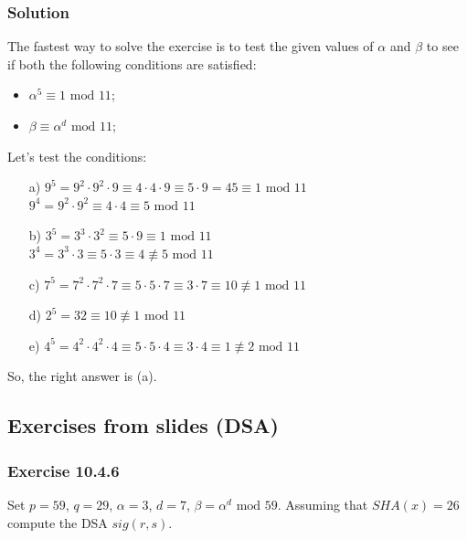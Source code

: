\documentclass[11pt, a4paper]{article}
\newcommand{\mymod}{
    \text{ mod }
}
\begin{document}
\subsubsection*{Solution}
The fastest way to solve the exercise is to test the given values of $\alpha$ and $\beta$ to see if both the following conditions are satisfied:
\begin{itemize}
    \item $\alpha^5\equiv1\mymod11$;
    \item $\beta\equiv\alpha^d\mymod11$;
\end{itemize}
Let's test the conditions:
\begin{itemize}
    \item[a)] $9^5=9^2\cdot9^2\cdot9\equiv4\cdot4\cdot9\equiv5\cdot9=45\equiv1\mymod11$ \textcolor{Green}{\checkmark}\\
    $9^4=9^2\cdot9^2\equiv4\cdot4\equiv5\mymod11$ \textcolor{Green}{\checkmark}
    \item[b)] $3^5=3^3\cdot3^2\equiv5\cdot9\equiv1\mymod11$ \checkmark\\
    $3^4=3^3\cdot3\equiv5\cdot3\equiv4\not\equiv5\mymod11$
    \item[c)] $7^5=7^2\cdot7^2\cdot7\equiv5\cdot5\cdot7\equiv3\cdot7\equiv10\not\equiv1\mymod11$
    \item[d)] $2^5=32\equiv10\not\equiv1\mymod11$
    \item[e)] $4^5=4^2\cdot4^2\cdot4\equiv5\cdot5\cdot4\equiv3\cdot4\equiv1\not\equiv2\mymod11$
\end{itemize}
So, the right answer is (a).

\newpage
\subsection{Exercises from slides (DSA)}
\subsubsection{Exercise 10.4.6}
Set $p=59$, $q=29$, $\alpha=3$, $d=7$, $\beta=\alpha^d\mymod59$. Assuming that $SHA(x)=26$ compute the DSA $sig(r,s)$.
\end{document}
